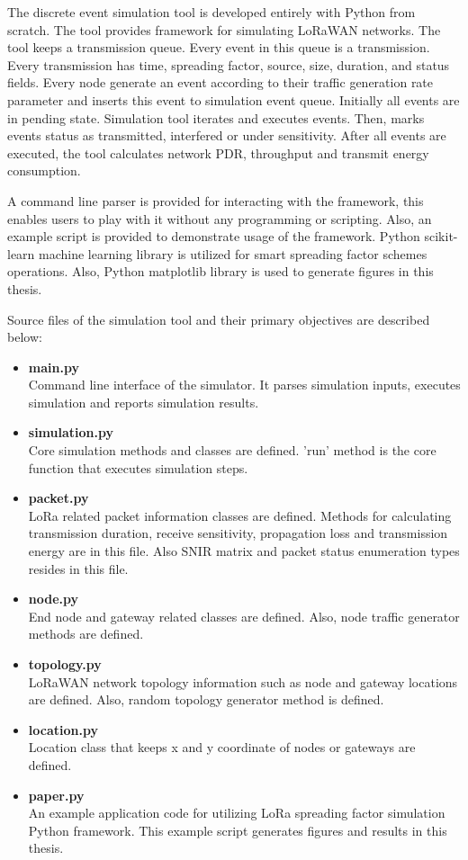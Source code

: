 The discrete event simulation tool is developed entirely with Python from scratch. The tool provides framework for simulating LoRaWAN networks. The tool keeps a transmission queue. Every event in this queue is a transmission. Every transmission has time, spreading factor, source, size, duration, and status fields. Every node generate an event according to their traffic generation rate parameter and inserts this event to simulation event queue. Initially all events are in pending state. Simulation tool iterates and executes events. Then, marks events status as transmitted, interfered or under sensitivity. After all events are executed, the tool calculates network PDR, throughput and transmit energy consumption.

A command line parser is provided for interacting with the framework, this enables users to play with it without any programming or scripting. Also, an example script is provided to demonstrate usage of the framework. Python scikit-learn machine learning library is utilized for smart spreading factor schemes operations. Also, Python matplotlib library is used to generate figures in this thesis.

Source files of the simulation tool and their primary objectives are described below:

\begin{itemize}
  \item \textbf{main.py} \\ Command line interface of the simulator. It parses simulation inputs, executes simulation and reports simulation results.
  \item \textbf{simulation.py} \\ Core simulation methods and classes are defined. 'run' method is the core function that executes simulation steps.
  \item \textbf{packet.py} \\ LoRa related packet information classes are defined. Methods for calculating transmission duration, receive sensitivity, propagation loss and transmission energy are in this file. Also SNIR matrix and packet status enumeration types resides in this file.
  \item \textbf{node.py} \\ End node and gateway related classes are defined. Also, node traffic generator methods are defined.
  \item \textbf{topology.py} \\ LoRaWAN network topology information such as node and gateway locations are defined. Also, random topology generator method is defined.
  \item \textbf{location.py} \\ Location class that keeps x and y coordinate of nodes or gateways are defined.
  \item \textbf{paper.py} \\ An example application code for utilizing LoRa spreading factor simulation Python framework. This example script generates figures and results in this thesis.
\end{itemize}

